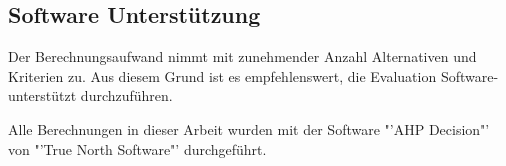 \subsection{Software Unterstützung}
Der Berechnungsaufwand nimmt mit zunehmender Anzahl Alternativen und Kriterien zu. Aus diesem Grund ist es empfehlenswert, die Evaluation Software-unterstützt durchzuführen.

Alle Berechnungen in dieser Arbeit wurden mit der Software "'AHP Decision"' von "'True North Software"' durchgeführt.
